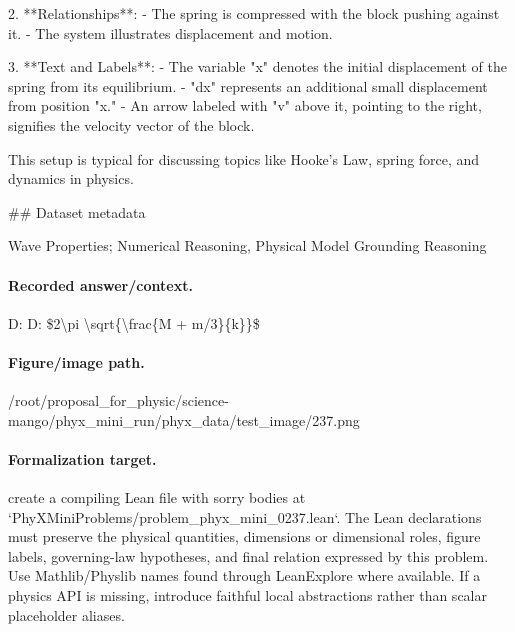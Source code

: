 2. **Relationships**:
   - The spring is compressed with the block pushing against it.
   - The system illustrates displacement and motion.

3. **Text and Labels**:
   - The variable "x" denotes the initial displacement of the spring from its equilibrium.
   - "dx" represents an additional small displacement from position "x."
   - An arrow labeled with "v" above it, pointing to the right, signifies the velocity vector of the block.

This setup is typical for discussing topics like Hooke's Law, spring force, and dynamics in physics.

\#\# Dataset metadata

Wave Properties; Numerical Reasoning, Physical Model Grounding Reasoning

\paragraph{Recorded answer/context.}
D: D: \$2\textbackslash{}pi \textbackslash{}sqrt\{\textbackslash{}frac\{M + m/3\}\{k\}\}\$

\paragraph{Figure/image path.}
/root/proposal\_for\_physic/science-mango/phyx\_mini\_run/phyx\_data/test\_image/237.png

\paragraph{Formalization target.}
create a compiling Lean file with sorry bodies at `PhyXMiniProblems/problem\_phyx\_mini\_0237.lean`. The Lean declarations must preserve the physical quantities, dimensions or dimensional roles, figure labels, governing-law hypotheses, and final relation expressed by this problem.
Use Mathlib/Physlib names found through LeanExplore where available. If a physics API is missing, introduce faithful local abstractions rather than scalar placeholder aliases.

